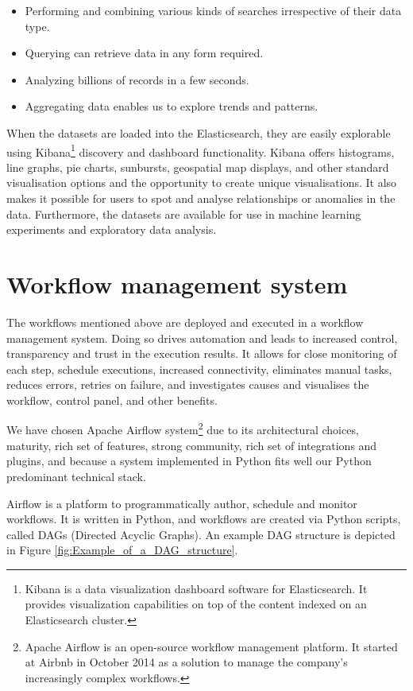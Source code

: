 \begin{itemize}
	\item Performing and combining various kinds of searches irrespective of their data type.
	\item Querying can retrieve data in any form required.
	\item Analyzing billions of records in a few seconds.
	\item Aggregating data enables us to explore trends and patterns.
\end{itemize}

When the datasets are loaded into the Elasticsearch, they are easily explorable using Kibana\footnote{ Kibana is a data visualization dashboard software for Elasticsearch. It provides visualization capabilities on top of the content indexed on an Elasticsearch cluster. } discovery and dashboard functionality. Kibana offers histograms, line graphs, pie charts, sunbursts, geospatial map displays, and other standard visualisation options and the opportunity to create unique visualisations. It also makes it possible for users to spot and analyse relationships or anomalies in the data. Furthermore, the datasets are available for use in machine learning experiments and exploratory data analysis. 

\section{Workflow management system}

The workflows mentioned above are deployed and executed in a workflow management system. Doing so drives automation and leads to increased control, transparency and trust in the execution results. It allows for close monitoring of each step, schedule executions, increased connectivity, eliminates manual tasks, reduces errors, retries on failure, and investigates causes and visualises the workflow, control panel, and other benefits. 

We have chosen Apache Airflow system\footnote{ Apache Airflow is an open-source workflow management platform. It started at Airbnb in October 2014 as a solution to manage the company's increasingly complex workflows. } due to its architectural choices, maturity, rich set of features, strong community, rich set of integrations and plugins, and because a system implemented in Python fits well our Python predominant technical stack. 

Airflow is a platform to programmatically author, schedule and monitor workflows. It is written in Python, and workflows are created via Python scripts, called DAGs (Directed Acyclic Graphs). An example DAG structure is depicted in Figure \ref{fig:Example_of_a_DAG_structure}. 

